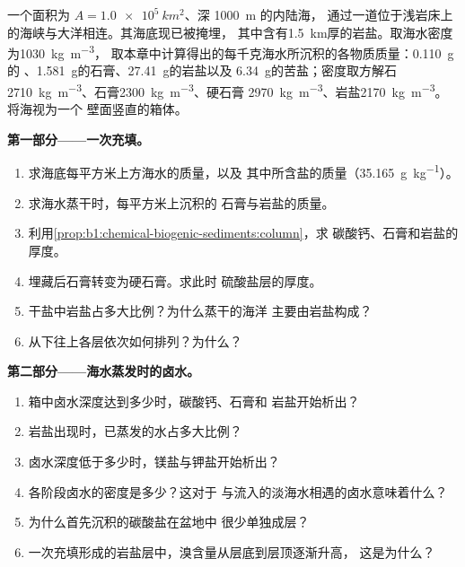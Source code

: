 \begin{problem}
\label{pb:b1:chemical-biogenic-sediments:1}
一个面积为 $A = \qty{1.0e5}{km^2}$、深 \qty{1000}{m} 的内陆海，
通过一道位于浅岩床上的海峡与大洋相连。其海底现已被掩埋，
其中含有\qty{1.5}{km}厚的岩盐。取海水密度为\qty{1030}{kg.m^{-3}}，
取本章中计算得出的每千克海水所沉积的各物质质量：\qty{0.110}{g}的
、\qty{1.581}{g}的石膏、\qty{27.41}{g}的岩盐以及
\qty{6.34}{g}的苦盐；密度取方解石
\qty{2710}{kg.m^{-3}}、石膏\qty{2300}{kg.m^{-3}}、硬石膏
\qty{2970}{kg.m^{-3}}、岩盐\qty{2170}{kg.m^{-3}}。将海视为一个
壁面竖直的箱体。

\medskip
\noindent\textbf{第一部分——一次充填。}
\begin{enumerate}
  \item 求海底每平方米上方海水的质量，以及
        其中所含盐的质量（\qty{35.165}{g.kg^{-1}}）。
  \item 求海水蒸干时，每平方米上沉积的
        石膏与岩盐的质量。
  \item 利用\cref{prop:b1:chemical-biogenic-sediments:column}，求
        碳酸钙、石膏和岩盐的厚度。
  \item 埋藏后石膏转变为硬石膏。求此时
        硫酸盐层的厚度。
  \item 干盐中岩盐占多大比例？为什么蒸干的海洋
        主要由岩盐构成？
  \item 从下往上各层依次如何排列？为什么？
\end{enumerate}

\noindent\textbf{第二部分——海水蒸发时的卤水。}
\begin{enumerate}[resume]
  \item 箱中卤水深度达到多少时，碳酸钙、石膏和
        岩盐开始析出？
  \item 岩盐出现时，已蒸发的水占多大比例？
  \item 卤水深度低于多少时，镁盐与钾盐开始析出？
  \item 各阶段卤水的密度是多少？这对于
        与流入的淡海水相遇的卤水意味着什么？
  \item 为什么首先沉积的碳酸盐在盆地中
        很少单独成层？
  \item 一次充填形成的岩盐层中，溴含量从层底到层顶逐渐升高，
        这是为什么？
\end{enumerate}


\end{problem}
